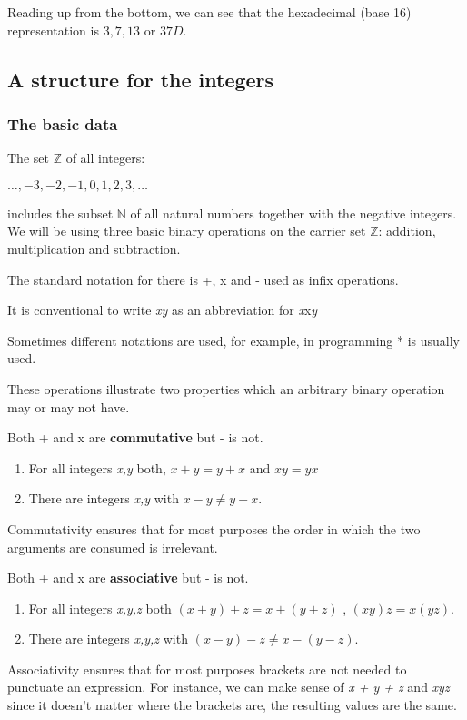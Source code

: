 \documentclass{article}
\begin{document}
Reading up from the bottom, we can see that the hexadecimal (base 16) representation is $3,7,13$ or $37D$.

\subsection{A structure for the integers}
\subsubsection{The basic data}
The set $\mathbb{Z}$ of all integers: 

$\ldots,-3,-2,-1,0,1,2,3,\ldots$

includes the subset $\mathbb{N}$ of all natural numbers together with the negative integers. We will be using three basic binary operations on the carrier set $\mathbb{Z}$: addition, multiplication and subtraction.

The standard notation for there is +, x and - used as infix operations.

It is conventional to write {\it xy} as an abbreviation for {\it x}x{\it y}

Sometimes different notations are used, for example, in programming * is usually used.

These operations illustrate two properties which an arbitrary binary operation may or may not have.
 
Both + and x are {\bf commutative} but - is not.

\begin{enumerate}
\item For all integers {\it x,y} both, $x + y = y + x$ and $xy = yx$
\item There are integers {\it x,y} with $x - y \ne y - x$.
\end{enumerate}

Commutativity ensures that for most purposes the order in which the two arguments are consumed is irrelevant.

Both + and x are {\bf associative} but - is not.

\begin{enumerate}
\item For all integers {\it x,y,z} both $(x + y) + z = x + (y + z)$ , $(xy)z = x(yz)$.
\item There are integers {\it x,y,z} with $(x - y) - z \ne x - (y - z)$.
\end{enumerate}

Associativity ensures that for most purposes brackets are not needed to punctuate an expression. For instance, we can make sense of {\it x + y + z} and {\it xyz} since it doesn't matter where the brackets are, the resulting values are the same.
\end{document}
